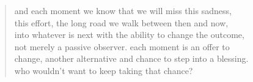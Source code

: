 \begin{verse}
and each moment we know that we will miss this sadness, \\
this effort, the long road we walk between then and now, \\
into whatever is next with the ability to change the outcome, \\
not merely a passive observer. each moment is an offer to \\
change, another alternative and chance to step into a blessing. \\
who wouldn't want to keep taking that chance? 
\end{verse}
